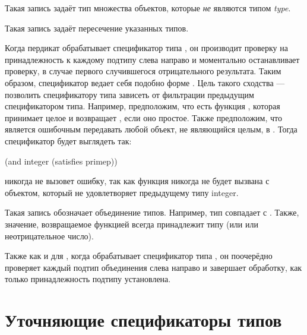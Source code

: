 \begin{flushdesc}
\item[\cd{(not \emph{type})}]

  Такая запись задаёт тип множества объектов, которые \emph{не} являются типом
  \emph{type}. 

\item[\cd{(and \emph{type1} \emph{type2} ...)}]

  Такая запись задаёт пересечение указанных типов.

  Когда пердикат  обрабатывает спецификатор типа , он
  производит проверку на принадлежность к каждому подтипу слева направо и
  моментально останавливает проверку, в случае первого случившегося отрицательного
  результата. Таким образом, спецификатор  ведает себя подобно форме
  . Цель такого сходства --- позволить спецификатору типа 
  зависеть от фильтрации предыдущим спецификатором типа. Например, предположим,
  что есть функция , которая принимает целое и возвращает {\true},
  если оно простое. Также предположим, что является ошибочным передавать любой
  объект, не являющийся целым, в . Тогда спецификатор будет выглядеть
  так:
  \begin{lisp}
    (and integer (satisfies primep))
  \end{lisp}
  никогда не вызовет ошибку, так как функция  никогда не будет вызвана
  с объектом, который не удовлетворяет предыдущему типу integer.

\item[\cd{(or \emph{type1} \emph{type2} ...)}]

  Такая запись обозначает объединение типов. Например, тип  совпадает с
  . Также, значение, возвращаемое функцией  всегда
  принадлежит типу  (или {\nil} или неотрицательное число).

  Также как и для , когда  обрабатывает спецификатор типа
  , он поочерёдно проверяет каждый подтип объединения слева направо и
  завершает обработку, как только принадлежность подтипу установлена.
\end{flushdesc}

\section{Уточняющие спецификаторы типов}
\label{SPECIALIZED-TYPE-SPECIFIER-SECTION}

